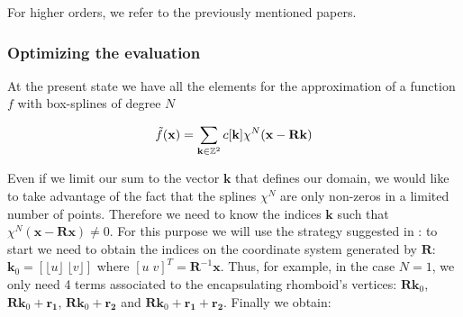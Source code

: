 \documentclass[proc]{edpsmath}
\begin{document}
%

For higher orders, we refer to the previously mentioned papers.

\subsubsection{Optimizing the evaluation}

At the present state we have all the elements for the approximation of a function $f$ with box-splines of degree $N$

\begin{equation}
\tilde{f}(\mathbf{x}) = \sum_{\mathbf{k} \in \mathbb{Z}^2} c[\mathbf{k}] \chi^N(\mathbf{x} - \mathbf{R}\mathbf{k})
\end{equation}

Even if we limit our sum to the vector $\mathbf{k}$ that defines our domain, we would like to take advantage of the fact that the splines $\chi^N$ are only non-zeros in a limited number of points. Therefore we need to know the indices $\mathbf{k}$ such that $\chi^N(\mathbf{x} - \mathbf{R} \mathbf{x}) \neq 0$. For this purpose we will use the strategy suggested in \cite{Condat2007}: to start we need to obtain the indices on the coordinate system generated by $\mathbf{R}$: $\mathbf{k}_0 = \left[ \lfloor u \rfloor \; \lfloor v \rfloor \right]$ where $\left[ u \; v \right]^T = \mathbf{R}^ {-1} \mathbf{x} $. Thus, for example, in the case $N=1$, we only need 4 terms associated to the encapsulating rhomboid's vertices: $\mathbf{R}\mathbf{k}_0$, $\mathbf{R}\mathbf{k}_0 + \mathbf{r_1}$, $\mathbf{R}\mathbf{k}_0 + \mathbf{r_2}$ and $\mathbf{R}\mathbf{k}_0 + \mathbf{r_1} + \mathbf{r_2}$. Finally we obtain:
\end{document}
